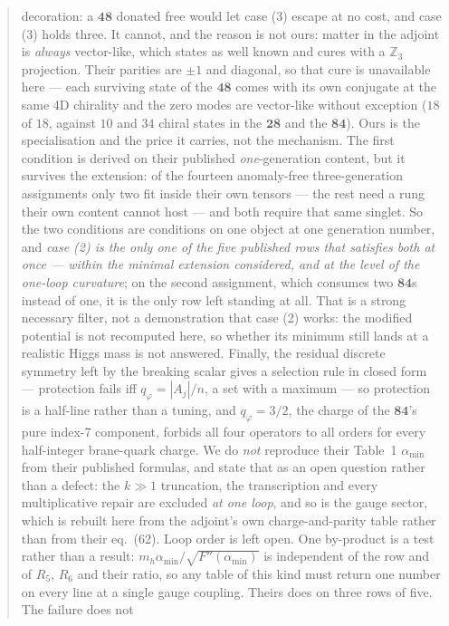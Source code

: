 \documentclass[11pt,a4paper]{article}
\newcommand{\ZZ}{\mathbb{Z}}
\newcommand{\rep}[1]{\mathbf{#1}}
\newcommand{\amin}{\alpha_{\min}}
\begin{document}
\begin{abstract}
decoration: a $\rep{48}$ donated free would let case (3) escape at no cost, and case (3) holds three.
It cannot, and the reason is not ours: matter in the adjoint is \emph{always} vector-like, which
\cite{GMN} states as well known and cures with a $\ZZ_3$ projection. Their parities are $\pm1$ and
diagonal, so that cure is unavailable here --- each surviving state of the $\rep{48}$ comes with its
own conjugate at the same 4D chirality and the zero modes are vector-like without exception ($18$ of
$18$, against $10$ and $34$ chiral states in the $\rep{28}$ and the $\rep{84}$). Ours is the
specialisation and the price it carries, not the mechanism.
The first condition is derived on their published \emph{one}-generation content, but it survives the
extension: of the fourteen anomaly-free three-generation assignments only two fit inside their own
tensors --- the rest need a rung their own content cannot host --- and both require that
same singlet. So the two conditions are conditions on one object at one generation number, and
\emph{case (2) is the only one of the five published rows that satisfies both at once --- within the
minimal extension considered, and at the level of the one-loop curvature}; on the second assignment,
which consumes two $\rep{84}$s instead of one, it is the only row left standing at all. That is a
strong necessary filter, not a demonstration that case (2) works: the modified potential is not
recomputed here, so whether its minimum still lands at a realistic Higgs mass is not answered.
Finally, the residual discrete symmetry left by the breaking scalar gives a selection rule in closed
form --- protection fails iff $q_\varphi=|A_j|/n$, a set with a maximum --- so protection is a
half-line rather than a tuning, and $q_\varphi=3/2$, the charge of the $\rep{84}$'s pure index-7
component, forbids all four operators to all orders for every half-integer brane-quark charge.
We do \emph{not} reproduce their Table~1 $\amin$ from their published formulas, and state that as an
open question rather than a defect: the $k\gg1$ truncation, the transcription and every
multiplicative repair are excluded \emph{at one loop}, and so is the gauge sector, which is rebuilt
here from the adjoint's own charge-and-parity table rather than from their eq.~(62). Loop order is
left open. One by-product is a test rather than a result: $m_h\amin/\sqrt{F''(\amin)}$ is independent of
the row and of $R_5$, $R_6$ and their ratio, so any table of this kind must return one number on
every line at a single gauge coupling. Theirs does on three rows of five. The failure does not

\end{abstract}
\end{document}
